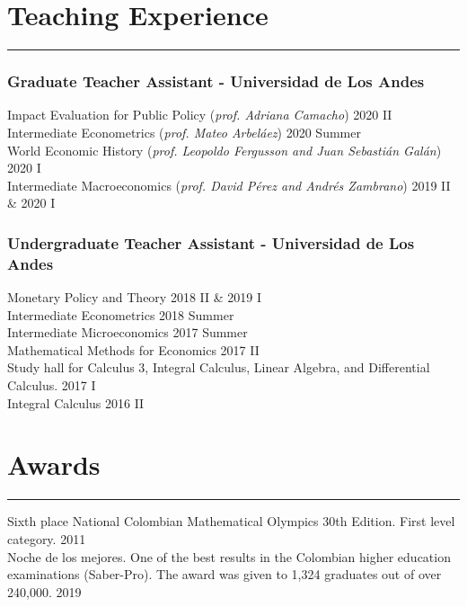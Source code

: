 \documentclass[12pt, letterpaper]{article}
\begin{document}
\newpage

\section*{Teaching Experience}
\vspace*{-8mm}
\noindent \rule{\linewidth}{0.2mm}
\vspace*{-12mm}
\subsubsection*{Graduate Teacher Assistant - Universidad de Los Andes}
\vspace*{-1mm}
\noindent
Impact Evaluation for Public Policy (\textit{prof. Adriana Camacho}) \hfill 2020 II \\
Intermediate Econometrics (\textit{prof. Mateo Arbeláez}) \hfill 2020 Summer \\
World Economic History (\small{\textit{prof. Leopoldo Fergusson and Juan Sebastián Galán}})  \hfill  2020 I  \\
Intermediate Macroeconomics (\textit{prof. David Pérez and Andrés Zambrano}) \hfill 2019 II \& 2020 I \\

\vspace*{-7mm}
\subsubsection*{Undergraduate Teacher Assistant - Universidad de Los Andes}
\vspace*{-1mm}
\noindent
Monetary Policy and Theory \hfill 2018 II \& 2019 I \\
Intermediate Econometrics \hfill 2018 Summer  \\
Intermediate Microeconomics \hfill 2017 Summer \\
Mathematical Methods for Economics \hfill 2017 II \\ 
Study hall for Calculus 3, Integral Calculus, Linear Algebra, and Differential Calculus. \hfill 2017 I \\
Integral Calculus \hfill  2016 II

\vspace*{-4mm}

\section*{Awards}
\vspace*{-8mm}
\noindent \rule{\linewidth}{0.2mm}
\noindent
Sixth place National Colombian Mathematical Olympics 30th Edition. First level category. \hfill 2011 \\ [1mm]
Noche de los mejores. One of the best results in the Colombian higher education examinations  \newline (Saber-Pro). The award was given to 1,324 graduates out of over 240,000. \hfill 2019 \\
\vspace{-8mm}
\end{document}
